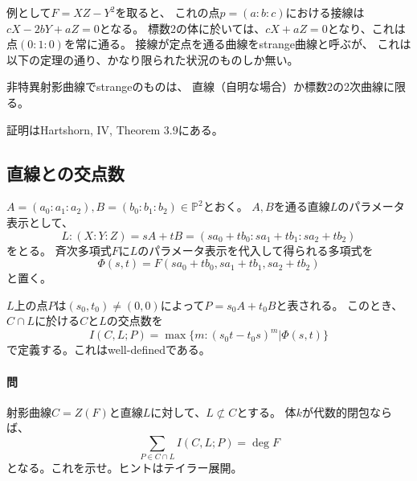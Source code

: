 \documentclass[a4]{article}
\newcommand{\proj}{\mathbb{P}}
\begin{document}
        例として$F=XZ-Y^2$を取ると、
        これの点$p=(a:b:c)$における接線は$cX-2bY+aZ=0$となる。
        標数2の体に於いては、$cX+aZ=0$となり、これは点$(0:1:0)$を常に通る。
        接線が定点を通る曲線をstrange曲線と呼ぶが、
        これは以下の定理の通り、かなり限られた状況のものしか無い。
        \begin{Them}[Samuel]
            非特異射影曲線でstrangeのものは、
            直線（自明な場合）か標数2の2次曲線に限る。
        \end{Them}
        証明はHartshorn, IV, Theorem 3.9にある。

        \subsection{直線との交点数}
        $A=(a_0:a_1:a_2), B=(b_0:b_1:b_2) \in \proj^2$とおく。
        $A, B$を通る直線$L$のパラメータ表示として、
        \[ L: (X:Y:Z)=sA+tB=(s a_0+t b_0:s a_1+t b_1:s a_2+t b_2) \]
        をとる。
        斉次多項式$F$に$L$のパラメータ表示を代入して得られる多項式を
        \[ \Phi(s,t)=F(s a_0+t b_0, s a_1+t b_1, s a_2+t b_2) \]
        と置く。

        $L$上の点$P$は$(s_0, t_0) \neq (0, 0)$によって$P=s_0 A+t_0 B$と表される。
        このとき、$C \cap L$に於ける$C$と$L$の交点数を
        \[ I(C, L; P)=\max \{ m : (s_0 t-t_0 s)^m | \Phi(s,t) \} \]
        で定義する。これはwell-definedである。

        \paragraph{問}
        射影曲線$C=Z(F)$と直線$L$に対して、$L \not \subset C$とする。
        体$k$が代数的閉包ならば、
        \[ \sum_{P \in C \cap L}{I(C, L; P)}=\deg F \]
        となる。これを示せ。ヒントはテイラー展開。
\end{document}
